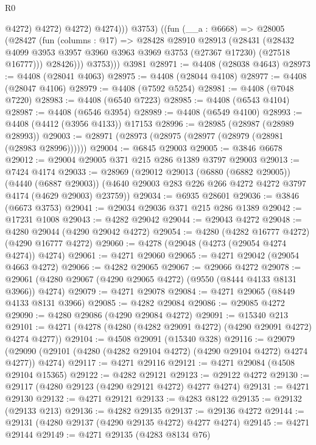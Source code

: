 \begin{lexlean}{R0}
\begin{coremodule}
                    @4272)
                  @4272)
                @4272)
              @4274)))
          @3753)
        ((fun (__a : @6668) =>
        @28005
          (@28427
            (fun (columns : @17) =>
            @28428
              @28910
              @28913
              (@28431
                (@28432 @4099 @3953 @3957 @3960 @3963 @3969 @3753 (@27367 @17230) (@27518 @16777)))
              @28426)))
          @3753)))
    @3981
@28971 := @4408 (@28038 @4643)
@28973 := @4408 (@28041 @4063)
@28975 := @4408 (@28044 @4108)
@28977 := @4408 (@28047 @4106)
@28979 := @4408 (@7592 @5254)
@28981 := @4408 (@7048 @7220)
@28983 := @4408 (@6540 @7223)
@28985 := @4408 (@6543 @4104)
@28987 := @4408 (@6546 @3954)
@28989 := @4408 (@6549 @4100)
@28993 := @4408 (@4412 (@3956 @4133)) @17153
@28996 := @28985 (@28987 (@28989 @28993))
@29003 := @28971 (@28973 (@28975 (@28977 (@28979 (@28981 (@28983 @28996))))))
@29004 := @6845 @29003
@29005 := @3846 @6678
@29012 := @29004 @29005 @371 @215 @286 @1389 @3797 @29003
@29013 := @7424 @4174
@29033 := @28969
    (@29012
      @29013
      (@6880 (@6882 @29005))
      (@4440 (@6887 @29003))
      (@4640 @29003 @283 @226 @266 @4272 @4272 @3797 @4174 (@4629 @29003) @23759))
@29034 := @6935 @28601
@29036 := @3846 (@6673 @3753)
@29041 := @29034 @29036 @371 @215 @286 @1389
@29042 := @17231 @1008
@29043 := @4282 @29042
@29044 := @29043 @4272
@29048 := @4280 @29044 (@4290 @29042 @4272)
@29054 := @4280 (@4282 @16777 @4272) (@4290 @16777 @4272)
@29060 := @4278 (@29048 (@4273 (@29054 @4274 @4274)) @4274)
@29061 := @4271 @29060
@29065 := @4271 @29042 (@29054 @4663 @4272)
@29066 := @4282 @29065
@29067 := @29066 @4272
@29078 := @29061 (@4280 @29067 (@4290 @29065 @4272) (@9550 (@8444 @4133 @8131 @3966)) @4274)
@29079 := @4271 @29078
@29084 := @4271 @29065 (@8449 @4133 @8131 @3966)
@29085 := @4282 @29084
@29086 := @29085 @4272
@29090 := @4280 @29086 (@4290 @29084 @4272)
@29091 := @15340 @213
@29101 := @4271 (@4278 (@4280 (@4282 @29091 @4272) (@4290 @29091 @4272) @4274 @4277))
@29104 := @4508 @29091 (@15340 @328)
@29116 := @29079
    (@29090 (@29101 (@4280 (@4282 @29104 @4272) (@4290 @29104 @4272) @4274 @4277)) @4274)
@29117 := @4271 @29116
@29121 := @4271 @29084 (@4508 @29104 @15365)
@29122 := @4282 @29121
@29123 := @29122 @4272
@29130 := @29117 (@4280 @29123 (@4290 @29121 @4272) @4277 @4274)
@29131 := @4271 @29130
@29132 := @4271 @29121
@29133 := @4283 @8122
@29135 := @29132 (@29133 @213)
@29136 := @4282 @29135
@29137 := @29136 @4272
@29144 := @29131 (@4280 @29137 (@4290 @29135 @4272) @4277 @4274)
@29145 := @4271 @29144
@29149 := @4271 @29135 (@4283 @8134 @76)

\end{coremodule}
\end{lexlean}
